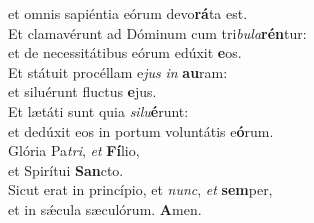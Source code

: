 \oddverse et omnis sapiéntia eórum devo\textbf{rá}ta est.\\
\evenverse Et clamavérunt ad Dóminum cum tri\textit{bu}\textit{la}\textbf{rén}tur:~\*\\
\evenverse et de necessitátibus eórum edúxit \textbf{e}os.\\
\oddverse Et státuit procéllam e\textit{jus} \textit{in} \textbf{au}ram:~\*\\
\oddverse et siluérunt fluctus \textbf{e}jus.\\
\evenverse Et lætáti sunt quia \textit{si}\textit{lu}\textbf{é}runt:~\*\\
\evenverse et dedúxit eos in portum voluntátis e\textbf{ó}rum.\\
\oddverse Glória Pa\textit{tri}, \textit{et} \textbf{Fí}lio,~\*\\
\oddverse et Spirítui \textbf{San}cto.\\
\evenverse Sicut erat in princípio, et \textit{nunc}, \textit{et} \textbf{sem}per,~\*\\
\evenverse et in sǽcula sæculórum. \textbf{A}men.\\

